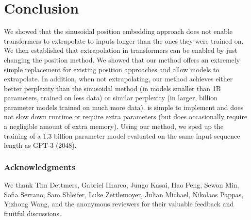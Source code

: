 \section{Conclusion}

We showed that the sinusoidal position embedding approach does not enable transformers to extrapolate to inputs longer than the ones they were trained on. We then established that extrapolation in transformers can be enabled by just changing the position method.
We showed that our \al method offers an extremely simple replacement for existing position approaches and allow models to extrapolate. In addition, when not extrapolating, our method achieves either better perplexity than the sinusoidal method (in models smaller than 1B parameters, trained on less data) or similar perplexity (in larger, billion parameter models trained on much more data). 
\al is simple to implement and does not slow down runtime or require extra parameters (but does occasionally require a negligible amount of extra memory).
Using our method, we sped up the training of a 1.3 billion parameter model evaluated on the same input sequence length as GPT-3 (2048). 

\subsubsection*{Acknowledgments}
We thank Tim Dettmers, Gabriel Ilharco, Jungo Kasai, Hao Peng, Sewon Min, Sofia Serrano, Sam Shleifer, Luke Zettlemoyer, Julian Michael, Nikolaos Pappas, Yizhong Wang, and the anonymous reviewers for their valuable feedback and fruitful discussions.